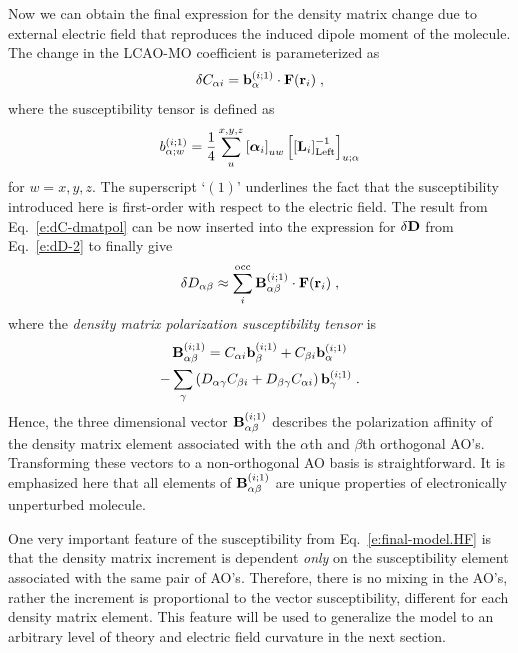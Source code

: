 \documentclass[aip,amsmath,amssymb,reprint,floatfix]{revtex4-1}
\newcommand{\BM}[1]{\bm{#1}}
\begin{document}
Now we can obtain the final expression for the density matrix change 
due to external electric field that reproduces the 
induced dipole moment of the molecule.
The change in the LCAO\hyp{}MO coefficient is parameterized as
%
\begin{equation} \label{e:dC-dmatpol}
 \delta C_{\alpha i} = {\bf b}_{\alpha}^{(i;1)} \cdot {\bf F}({\bf r}_i)  \;,
\end{equation}
%
where the susceptibility tensor is defined as
%
\begin{equation} \label{e:susceptibility-b}
  b_{\alpha;w}^{(i;1)}= \frac{1}{4} \sum_u^{x, y, z} \left[ {\BM{\alpha}}_i \right]_{uw}
   \left[ \left[ {\bf L}_i  \right]^{-1}_{\rm Left} \right]_{u;\alpha}  
\end{equation}
%
for $w=x,y,z$. 
The superscript `$(1)$' underlines the fact that the susceptibility introduced here
is first\hyp{}order with respect to the electric field.
The result from Eq.~\eqref{e:dC-dmatpol} can be now inserted into 
the expression for $\delta {\bf D}$ from Eq.~\eqref{e:dD-2} to finally give
%
\begin{equation}\label{e:final-model.HF}
 \delta D_{\alpha\beta} \approx \sum_i^{\rm occ} {\bf B}^{(i;1)}_{\alpha\beta} \cdot {\bf F}({\bf r}_i)  \;,
\end{equation}
%
where the \emph{density matrix polarization susceptibility tensor} is
%
\begin{multline}  \label{e:susceptibility-B}
 {\bf B}^{(i;1)}_{\alpha\beta} = 
                               C_{\alpha i} {\bf b}_{\beta}^{(i;1)} + C_{\beta i} {\bf b}_\alpha^{(i;1)} \\
                                - \sum_\gamma 
                                 \left( 
               D_{\alpha\gamma} C_{\beta i} + D_{\beta\gamma} C_{\alpha i}
                                 \right)
                                           {\bf b}_{\gamma}^{(i;1)}
 \;.
\end{multline}
%
Hence, the three dimensional vector ${\bf B}^{(i;1)}_{\alpha\beta}$ describes the polarization affinity
of the density matrix element associated with the $\alpha$th and $\beta$th orthogonal AO's.
Transforming these vectors to a non\hyp{}orthogonal AO basis is straightforward.
It is emphasized here that all elements of ${\bf B}_{\alpha\beta}^{(i;1)}$
are unique properties of electronically unperturbed molecule. 

One very important feature of the susceptibility from Eq.~\eqref{e:final-model.HF} is that
the density matrix increment is dependent \emph{only} on the susceptibility element associated with the same
pair of AO's. Therefore, there is no mixing in the AO's, rather the increment is proportional to the 
vector susceptibility, different for each density matrix element. This feature will be used to
generalize the model to an arbitrary level of theory and electric field curvature in the next section.
\end{document}
